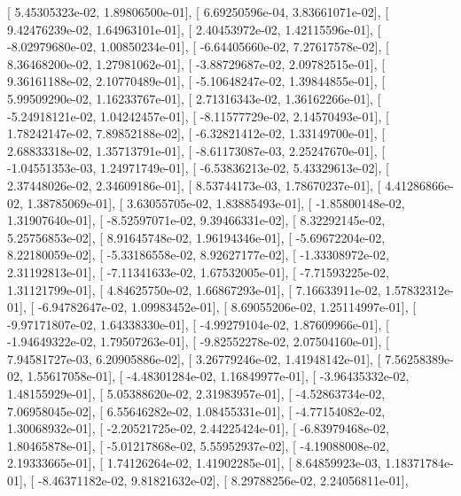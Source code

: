 \documentclass{article}
\begin{document}
       [  5.45305323e-02,   1.89806500e-01],
       [  6.69250596e-04,   3.83661071e-02],
       [  9.42476239e-02,   1.64963101e-01],
       [  2.40453972e-02,   1.42115596e-01],
       [ -8.02979680e-02,   1.00850234e-01],
       [ -6.64405660e-02,   7.27617578e-02],
       [  8.36468200e-02,   1.27981062e-01],
       [ -3.88729687e-02,   2.09782515e-01],
       [  9.36161188e-02,   2.10770489e-01],
       [ -5.10648247e-02,   1.39844855e-01],
       [  5.99509290e-02,   1.16233767e-01],
       [  2.71316343e-02,   1.36162266e-01],
       [ -5.24918121e-02,   1.04242457e-01],
       [ -8.11577729e-02,   2.14570493e-01],
       [  1.78242147e-02,   7.89852188e-02],
       [ -6.32821412e-02,   1.33149700e-01],
       [  2.68833318e-02,   1.35713791e-01],
       [ -8.61173087e-03,   2.25247670e-01],
       [ -1.04551353e-03,   1.24971749e-01],
       [ -6.53836213e-02,   5.43329613e-02],
       [  2.37448026e-02,   2.34609186e-01],
       [  8.53744173e-03,   1.78670237e-01],
       [  4.41286866e-02,   1.38785069e-01],
       [  3.63055705e-02,   1.83885493e-01],
       [ -1.85800148e-02,   1.31907640e-01],
       [ -8.52597071e-02,   9.39466331e-02],
       [  8.32292145e-02,   5.25756853e-02],
       [  8.91645748e-02,   1.96194346e-01],
       [ -5.69672204e-02,   8.22180059e-02],
       [ -5.33186558e-02,   8.92627177e-02],
       [ -1.33308972e-02,   2.31192813e-01],
       [ -7.11341633e-02,   1.67532005e-01],
       [ -7.71593225e-02,   1.31121799e-01],
       [  4.84625750e-02,   1.66867293e-01],
       [  7.16633911e-02,   1.57832312e-01],
       [ -6.94782647e-02,   1.09983452e-01],
       [  8.69055206e-02,   1.25114997e-01],
       [ -9.97171807e-02,   1.64338330e-01],
       [ -4.99279104e-02,   1.87609966e-01],
       [ -1.94649322e-02,   1.79507263e-01],
       [ -9.82552278e-02,   2.07504160e-01],
       [  7.94581727e-03,   6.20905886e-02],
       [  3.26779246e-02,   1.41948142e-01],
       [  7.56258389e-02,   1.55617058e-01],
       [ -4.48301284e-02,   1.16849977e-01],
       [ -3.96435332e-02,   1.48155929e-01],
       [  5.05388620e-02,   2.31983957e-01],
       [ -4.52863734e-02,   7.06958045e-02],
       [  6.55646282e-02,   1.08455331e-01],
       [ -4.77154082e-02,   1.30068932e-01],
       [ -2.20521725e-02,   2.44225424e-01],
       [ -6.83979468e-02,   1.80465878e-01],
       [ -5.01217868e-02,   5.55952937e-02],
       [ -4.19088008e-02,   2.19333665e-01],
       [  1.74126264e-02,   1.41902285e-01],
       [  8.64859923e-03,   1.18371784e-01],
       [ -8.46371182e-02,   9.81821632e-02],
       [  8.29788256e-02,   2.24056811e-01],
\end{document}
